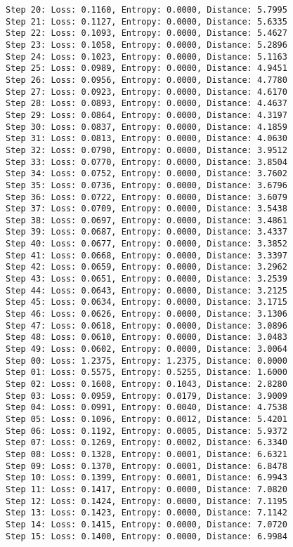 \documentclass[11pt]{article}
\begin{document}
\begin{Verbatim}[commandchars=\\\{\}]
Step 20: Loss: 0.1160, Entropy: 0.0000, Distance: 5.7995
Step 21: Loss: 0.1127, Entropy: 0.0000, Distance: 5.6335
Step 22: Loss: 0.1093, Entropy: 0.0000, Distance: 5.4627
Step 23: Loss: 0.1058, Entropy: 0.0000, Distance: 5.2896
Step 24: Loss: 0.1023, Entropy: 0.0000, Distance: 5.1163
Step 25: Loss: 0.0989, Entropy: 0.0000, Distance: 4.9451
Step 26: Loss: 0.0956, Entropy: 0.0000, Distance: 4.7780
Step 27: Loss: 0.0923, Entropy: 0.0000, Distance: 4.6170
Step 28: Loss: 0.0893, Entropy: 0.0000, Distance: 4.4637
Step 29: Loss: 0.0864, Entropy: 0.0000, Distance: 4.3197
Step 30: Loss: 0.0837, Entropy: 0.0000, Distance: 4.1859
Step 31: Loss: 0.0813, Entropy: 0.0000, Distance: 4.0630
Step 32: Loss: 0.0790, Entropy: 0.0000, Distance: 3.9512
Step 33: Loss: 0.0770, Entropy: 0.0000, Distance: 3.8504
Step 34: Loss: 0.0752, Entropy: 0.0000, Distance: 3.7602
Step 35: Loss: 0.0736, Entropy: 0.0000, Distance: 3.6796
Step 36: Loss: 0.0722, Entropy: 0.0000, Distance: 3.6079
Step 37: Loss: 0.0709, Entropy: 0.0000, Distance: 3.5438
Step 38: Loss: 0.0697, Entropy: 0.0000, Distance: 3.4861
Step 39: Loss: 0.0687, Entropy: 0.0000, Distance: 3.4337
Step 40: Loss: 0.0677, Entropy: 0.0000, Distance: 3.3852
Step 41: Loss: 0.0668, Entropy: 0.0000, Distance: 3.3397
Step 42: Loss: 0.0659, Entropy: 0.0000, Distance: 3.2962
Step 43: Loss: 0.0651, Entropy: 0.0000, Distance: 3.2539
Step 44: Loss: 0.0643, Entropy: 0.0000, Distance: 3.2125
Step 45: Loss: 0.0634, Entropy: 0.0000, Distance: 3.1715
Step 46: Loss: 0.0626, Entropy: 0.0000, Distance: 3.1306
Step 47: Loss: 0.0618, Entropy: 0.0000, Distance: 3.0896
Step 48: Loss: 0.0610, Entropy: 0.0000, Distance: 3.0483
Step 49: Loss: 0.0602, Entropy: 0.0000, Distance: 3.0064
Step 00: Loss: 1.2375, Entropy: 1.2375, Distance: 0.0000
Step 01: Loss: 0.5575, Entropy: 0.5255, Distance: 1.6000
Step 02: Loss: 0.1608, Entropy: 0.1043, Distance: 2.8280
Step 03: Loss: 0.0959, Entropy: 0.0179, Distance: 3.9009
Step 04: Loss: 0.0991, Entropy: 0.0040, Distance: 4.7538
Step 05: Loss: 0.1096, Entropy: 0.0012, Distance: 5.4201
Step 06: Loss: 0.1192, Entropy: 0.0005, Distance: 5.9372
Step 07: Loss: 0.1269, Entropy: 0.0002, Distance: 6.3340
Step 08: Loss: 0.1328, Entropy: 0.0001, Distance: 6.6321
Step 09: Loss: 0.1370, Entropy: 0.0001, Distance: 6.8478
Step 10: Loss: 0.1399, Entropy: 0.0001, Distance: 6.9943
Step 11: Loss: 0.1417, Entropy: 0.0000, Distance: 7.0820
Step 12: Loss: 0.1424, Entropy: 0.0000, Distance: 7.1195
Step 13: Loss: 0.1423, Entropy: 0.0000, Distance: 7.1142
Step 14: Loss: 0.1415, Entropy: 0.0000, Distance: 7.0720
Step 15: Loss: 0.1400, Entropy: 0.0000, Distance: 6.9984

\end{Verbatim}
\end{document}
